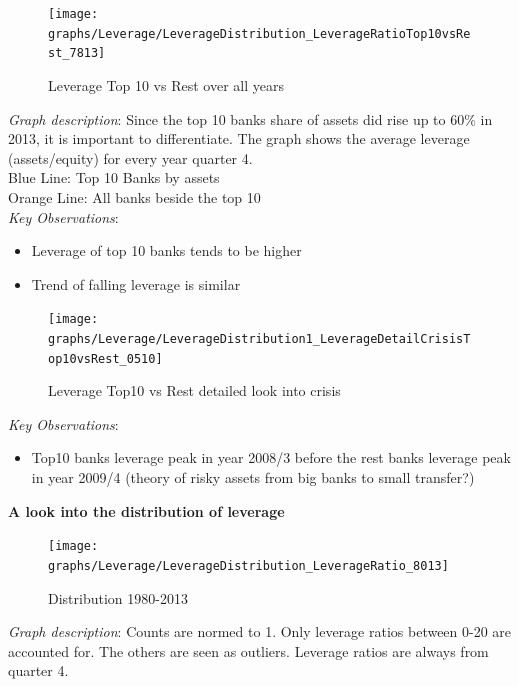 \documentclass[12pt, a4paper]{article} %
\begin{document}
\begin{figure}[hbtp]
\centering
\caption{Leverage Top 10 vs Rest over all years}
\texttt{[image: graphs/Leverage/LeverageDistribution\_LeverageRatioTop10vsRest\_7813]}
\end{figure}


\newpage

\noindent \textit{Graph description}: Since the top 10 banks share of assets did rise up to 60\% in 2013, it is important to differentiate. The graph shows the average leverage (assets/equity) for every year quarter 4.\\ Blue Line: Top 10 Banks by assets\\
Orange Line: All banks beside the top 10\\

\noindent \textit{Key Observations}:
\begin{itemize}
\item Leverage of top 10 banks tends to be higher
\item Trend of falling leverage is similar
\end{itemize}




\begin{figure}[hbtp]
\centering
\caption{Leverage Top10 vs Rest detailed look into crisis}
\texttt{[image: graphs/Leverage/LeverageDistribution1\_LeverageDetailCrisisTop10vsRest\_0510]}
\end{figure}

\noindent \textit{Key Observations}:
\begin{itemize}
\item Top10 banks leverage peak in year 2008/3 before the rest banks leverage peak in year 2009/4 (theory of risky assets from big banks to small transfer?) 
\end{itemize}

\pagebreak

\textbf{A look into the distribution of leverage}\\



\begin{figure}[hbtp]
\centering
\caption{Distribution 1980-2013}
\texttt{[image: graphs/Leverage/LeverageDistribution\_LeverageRatio\_8013]}
\end{figure}

\noindent \textit{Graph description}: Counts are normed to 1. Only leverage ratios between 0-20 are accounted for. The others are seen as outliers. Leverage ratios are always from quarter 4.
\\
\end{document}
